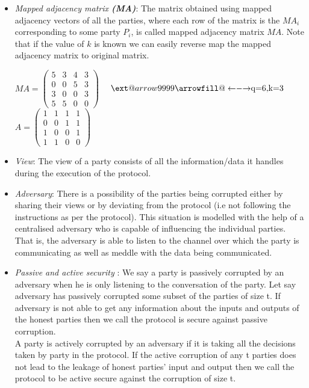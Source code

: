 \documentclass{llncs}
\makeatletter
\newcommand\xleftrightarrow[2][]{%
  \ext@arrow 9999{\longleftrightarrowfill@}{#1}{#2}}
\newcommand\longleftrightarrowfill@{%
  \arrowfill@\leftarrow\relbar\rightarrow}
\makeatother
\begin{document}
\begin{itemize}
\begin{center}
\end{center}

\item \emph{Mapped adjacency matrix \bf(MA)}: The matrix obtained using mapped adjacency vectors of all the parties, where each row of the matrix is the $MA_i$ corresponding to some party $P_i$, is called mapped adjacency matrix $MA$. Note that if the value of $k$ is known we can easily reverse map the mapped adjacency matrix to original matrix.
\begin{center}
$
MA=
  \begin{pmatrix}
    5 & 3 & 4 & 3  \\
    0 & 0 & 5 & 3  \\
    3 & 0 & 0 & 3  \\
    5 & 5 & 0 & 0
  \end{pmatrix}
  $
  $
\ \ \  \xleftrightarrow{\text{q=6,k=3}}
$
$
A=
  \begin{pmatrix}
    1 & 1 & 1 & 1  \\
    0 & 0 & 1 & 1  \\
    1 & 0 & 0 & 1  \\
    1 & 1 & 0 & 0
  \end{pmatrix}
  $

\end{center}

\item \emph{View}: The view of a party consists of all the information/data it handles during the execution of the protocol.  

\item \emph{Adversary}: There is a possibility of the parties being corrupted either by sharing their views or by deviating from the protocol (i.e not following the instructions as per the protocol). This situation is modelled with the help of a centralised adversary who is capable of influencing the individual parties. That is, the adversary is able to listen to the channel over which the party is communicating as well as meddle with the data being communicated.


\item \emph{Passive and active security }: We say a party is passively corrupted by an adversary when he is only listening to the conversation of the party. Let say adversary has passively corrupted some subset of the parties of size t. If adversary is not able to get any information about the inputs and outputs of the honest parties then we call the protocol is secure against passive corruption.\\
A party is actively corrupted by an adversary if it is taking all the decisions taken by party in the protocol. If the active corruption of any t parties does not lead to the leakage of honest parties' input and output then we call the protocol to be active secure against the corruption of size t.


\end{itemize}
\end{document}
